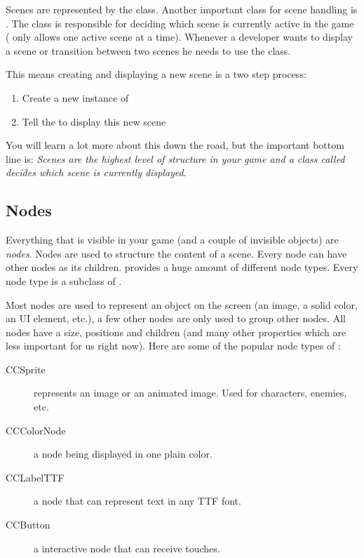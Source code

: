 Scenes are represented by the \ccscene{} class. Another
important \cocos{} class for scene handling is \ccdirector{}. The \ccdirector{}
class is responsible for deciding which scene is currently active in the game
(\cocos{} only allows one active scene at a time). Whenever a developer wants to
display a scene or transition between two scenes he needs to use the
\ccdirector{} class.

This means creating and displaying a new scene is a two step process:
\begin{enumerate}
\item Create a new instance of \ccscene{}
\item Tell the \ccdirector{} to display this new scene
\end{enumerate}

You will learn a lot more about this down the road, but the important bottom
line is: \textit{Scenes are the highest level of structure in your game and a
class called \ccdirector{} decides which scene is currently displayed}.

\subsection{Nodes}
Everything that is visible in your \cocos{} game (and a couple of invisible
objects) are \textit{nodes}. Nodes are used to structure the content of a scene.
Every node can have other nodes as its children. \cocos{} provides a huge amount
of different node types. Every node type is a subclass of \ccnode{}.

Most nodes are used to represent an object on the screen (an image, a solid
color, an UI element, etc.), a few other nodes are only used to group other
nodes. All nodes have a size, positions and children (and many other properties
which are less important for us right now). Here are some of the popular
node types of \cocos{}:

\begin{description}
  \item[CCSprite] represents an image or an animated image. Used for characters,
  enemies, etc.
  \item[CCColorNode] a node being displayed in one plain color.
  \item[CCLabelTTF] a node that can represent text in any TTF font.
  \item[CCButton] a interactive node that can receive touches.
\end{description}

